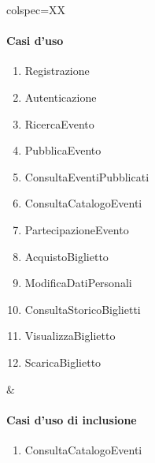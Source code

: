 \begin{table}[!hbp]
	\centering
	\begin{tblr}{colspec=XX}
		\begin{minipage}[t]{\linewidth}
			\paragraph{Casi d'uso}
			\begin{enumerate}[leftmargin=*]
				\item Registrazione 
				\item Autenticazione
				\item RicercaEvento
				\item PubblicaEvento
				\item ConsultaEventiPubblicati
				\item ConsultaCatalogoEventi
				\item PartecipazioneEvento
				\item AcquistoBiglietto
				\item ModificaDatiPersonali
				\item ConsultaStoricoBiglietti
				\item VisualizzaBiglietto
				\item ScaricaBiglietto
			\end{enumerate}
		\end{minipage} &
		\begin{minipage}[t]{\linewidth}
			\paragraph{Casi d'uso di inclusione}
			\begin{enumerate}[leftmargin=*]
                \item ConsultaCatalogoEventi
			\end{enumerate}

		\end{minipage}
	\end{tblr}
\end{table}
